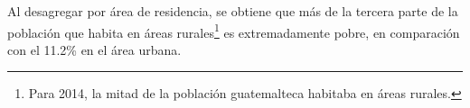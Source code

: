 Al desagregar por área de residencia, se obtiene que más de la tercera parte de la población que habita en áreas rurales\footnote{Para 2014, la mitad de la población guatemalteca habitaba en áreas rurales.} es extremadamente pobre, en comparación con el 11.2\% en el área urbana.
